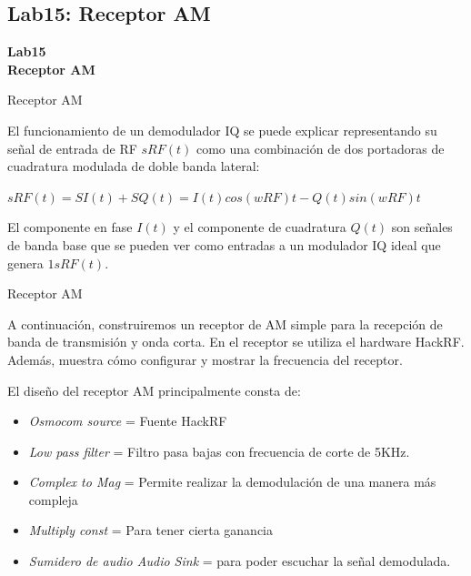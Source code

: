 \subsection{Lab15: Receptor AM}

\begin{frame}{}


\bfseries{\textrm{\LARGE Lab15\\ \Large Receptor AM}}
\raggedright
\end{frame}

\begin{frame}{Receptor AM}


El funcionamiento de un demodulador IQ se puede explicar representando su señal de entrada de RF $sRF(t)$ como una combinación de dos portadoras de cuadratura modulada de doble banda lateral:

\vspace{3mm}
\begin{center}
    $sRF (t)=S I(t)+S Q(t) = I(t)cos(w RF)t-Q(t)sin(w RF)t$ 
\end{center}

\vspace{2mm}
El componente en fase $I(t)$ y el componente de cuadratura $Q(t)$ son señales de banda base que se pueden ver como entradas a un modulador IQ ideal que genera $1sRF(t)$.
\end{frame}

\begin{frame}{Receptor AM}

A continuación, construiremos un receptor de AM simple para la recepción de banda de transmisión y onda corta. En el receptor se utiliza el hardware HackRF. Además, muestra cómo configurar y mostrar la frecuencia del receptor.\vspace{2mm}

El diseño del receptor AM principalmente consta de:

\begin{itemize}
    \item {\textit{Osmocom source} = Fuente HackRF}
    \item {\textit{Low pass filter} = Filtro pasa bajas con frecuencia de corte de 5KHz.}
    \item {\textit{Complex to Mag} = Permite realizar la demodulación de una manera más compleja}
    \item {\textit{Multiply const} = Para tener cierta ganancia}
    \item {\textit{Sumidero de audio Audio Sink} = para poder escuchar la señal demodulada.}
    
\end{itemize}{}

\end{frame}

